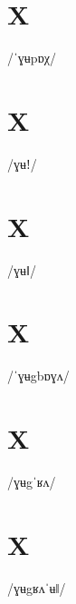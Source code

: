 \documentclass[10pt,a4paper,twoside]{book}
\begin{document}
\section*{X}

\begin{multicols}{3}
 {/ˈɣʉpɒχ/} {}
\end{multicols}

\section*{X}

\begin{multicols}{3}
 {/ɣʉǃ/} {}
\end{multicols}

\section*{X}

\begin{multicols}{3}
 {/ɣʉǁ/} {}
\end{multicols}

\section*{X}

\begin{multicols}{3}
 {/ˈɣʉgbɒɣʌ/} {}
\end{multicols}

\section*{X}

\begin{multicols}{3}
 {/ɣʉgˈʁʌ/} {}
\end{multicols}

\section*{X}

\begin{multicols}{3}
 {/ɣʉgʁʌˈʉǁ/} {}
\end{multicols}
\end{document}
